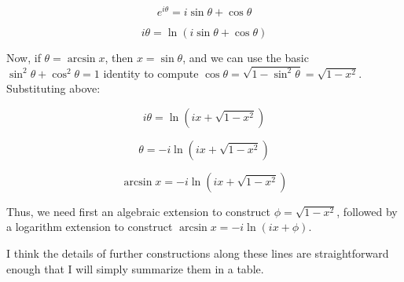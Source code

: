 $$e^{i\theta}=i\sin\theta+\cos\theta$$

$$i\theta=\ln(i\sin\theta+\cos\theta)$$

Now, if $\theta = \arcsin x$, then $x = \sin \theta$, and we can use
the basic $\sin^2 \theta + \cos^2 \theta = 1$ identity to compute
$\cos \theta = \sqrt{1-\sin^2\theta} = \sqrt{1-x^2}$.  Substituting above:

$$i\theta=\ln(i x+\sqrt{1-x^2})$$

$$\theta=-i\ln(i x+\sqrt{1-x^2})$$

$$\arcsin x=-i\ln(i x+\sqrt{1-x^2})$$

Thus, we need first an algebraic extension to construct $\phi = \sqrt{1-x^2}$,
followed by a logarithm extension to construct $\arcsin x = -i\ln(ix+\phi)$.

\endexample

I think the details of further constructions along these lines are
straightforward enough that I will simply summarize them in a table.

\vfill\eject



\def\sech{{\rm sech}}
\def\csch{{\rm csch}}

